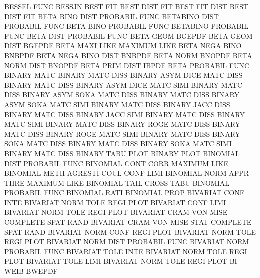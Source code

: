 BESSEL   FUNC                           BESSJN
BEST     FIT                            BEST     DIST FIT
BEST     FIT  DIST                      BEST     DIST FIT
BETA     BINO DIST                      PROBABIL FUNC
BETABINO DIST                           PROBABIL FUNC
BETA     BINO                           PROBABIL FUNC
BETABINO                                PROBABIL FUNC
BETA     DIST                           PROBABIL FUNC
BETA     GEOM                           BGEPDF
BETA     GEOM DIST                      BGEPDF
BETA     MAXI LIKE                      MAXIMUM  LIKE
BETA     NEGA BINO                      BNBPDF
BETA     NEGA BINO DIST                 BNBPDF
BETA     NORM                           BNOPDF
BETA     NORM DIST                      BNOPDF
BETA     PRIM DIST                      IBPDF
BETA                                    PROBABIL FUNC
BINARY   MATC                           BINARY   MATC DISS
BINARY   ASYM DICE MATC DISS            BINARY   MATC DISS
BINARY   ASYM DICE MATC SIMI            BINARY   MATC DISS
BINARY   ASYM SOKA MATC DISS            BINARY   MATC DISS
BINARY   ASYM SOKA MATC SIMI            BINARY   MATC DISS
BINARY   JACC DISS                      BINARY   MATC DISS
BINARY   JACC SIMI                      BINARY   MATC DISS
BINARY   MATC SIMI                      BINARY   MATC DISS
BINARY   ROGE MATC DISS                 BINARY   MATC DISS
BINARY   ROGE MATC SIMI                 BINARY   MATC DISS
BINARY   SOKA MATC DISS                 BINARY   MATC DISS
BINARY   SOKA MATC SIMI                 BINARY   MATC DISS
BINARY   TABU PLOT                      BINARY   PLOT
BINOMIAL DIST                           PROBABIL FUNC
BINOMIAL CONT CORR                      MAXIMUM  LIKE
BINOMIAL METH                           AGRESTI  COUL CONF LIMI
BINOMIAL NORM APPR THRE                 MAXIMUM  LIKE
BINOMIAL TAIL                           CROSS    TABU
BINOMIAL                                PROBABIL FUNC
BINOMIAL RATI                           BINOMIAL PROP
BIVARIAT CONF INTE                      BIVARIAT NORM TOLE REGI PLOT
BIVARIAT CONF LIMI                      BIVARIAT NORM TOLE REGI PLOT
BIVARIAT CRAM VON  MISE                 COMPLETE SPAT RAND
BIVARIAT CRAM VON  MISE STAT            COMPLETE SPAT RAND
BIVARIAT NORM CONF REGI PLOT            BIVARIAT NORM TOLE REGI PLOT
BIVARIAT NORM DIST                      PROBABIL FUNC
BIVARIAT NORM                           PROBABIL FUNC
BIVARIAT TOLE INTE                      BIVARIAT NORM TOLE REGI PLOT
BIVARIAT TOLE LIMI                      BIVARIAT NORM TOLE REGI PLOT
BI       WEIB                           BWEPDF
